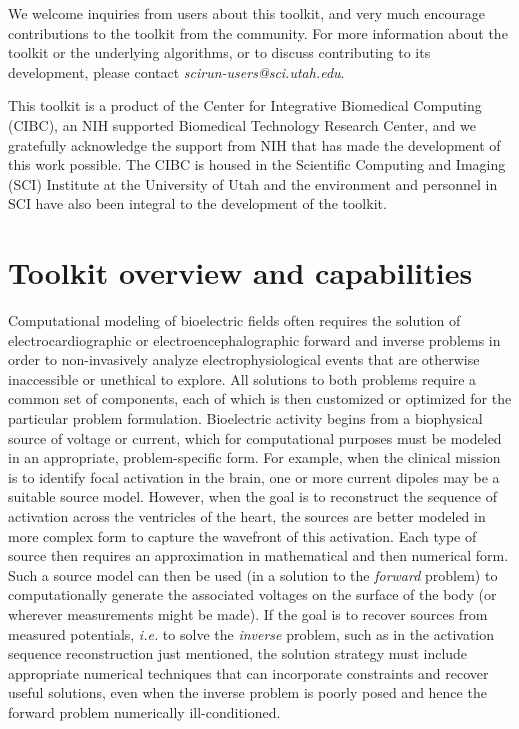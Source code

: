 \documentclass[fleqn,11pt,openany]{book}
\begin{document}
\begin{introduction}
We welcome inquiries from users about this toolkit, and very much encourage
contributions to the toolkit from the community. For more information
about the toolkit or the underlying algorithms, or to discuss contributing to
its development, please contact \textit{scirun-users@sci.utah.edu}.

This toolkit is a product of the Center for Integrative Biomedical
Computing (CIBC), an NIH supported Biomedical Technology Research Center,
and we gratefully acknowledge the support from NIH that has made the
development of this work possible. The CIBC is housed in the Scientific
Computing and Imaging (SCI) Institute at the University of Utah and the
environment and personnel in SCI have also been integral to the development of the toolkit.

\end{introduction}

\section{Toolkit overview and capabilities}

Computational modeling of bioelectric fields often requires the solution of
electrocardiographic or electroencephalographic forward and inverse
problems in order to non-invasively analyze electrophysiological events
that are otherwise inaccessible or unethical to explore. All solutions to
both problems require a common set of components, each of which is then
customized or optimized for the particular problem formulation.
Bioelectric activity begins from a biophysical source of voltage or current,
which for computational purposes must be modeled in an appropriate,
problem-specific form. For example, when the clinical mission is to
identify focal activation in the brain, one or more current dipoles may be
a suitable source model. However, when the goal is to reconstruct the
sequence of activation across the ventricles of the heart, the sources are
better modeled in more complex form to capture the wavefront of this
activation. Each type of source then requires an approximation in
mathematical and then numerical form. Such a source model can then be used
(in a solution to the \textit{forward} problem) to computationally generate
the associated voltages on the surface of the body (or wherever
measurements might be made). If the goal is to recover sources from
measured potentials, \textit{i.e.} to solve the \textit{inverse} problem,
such as in the activation sequence reconstruction just mentioned, the
solution strategy must include appropriate numerical techniques that can
incorporate constraints and recover useful solutions, even when the inverse
problem is poorly posed and hence the forward problem numerically ill-conditioned.
\end{document}
